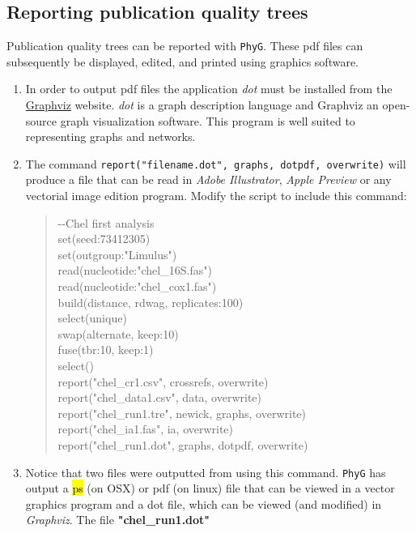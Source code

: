 \documentclass[11pt]{article}
\newcommand{\phyg}{\texttt{PhyG} }
\begin{document}
\subsection{Reporting publication quality trees}
\label{subsec:dotpdf}

Publication quality trees can be reported with \texttt{PhyG}. These pdf files can  
subsequently be displayed, edited, and printed using graphics software.

\begin{enumerate}

\item In order to output pdf files the application \textit{dot} must be installed from 
the \href{https://graphviz.org/download/}{Graphviz} website. \textit{dot} is a graph 
description language and Graphviz an open-source graph visualization software. 
This program is well suited to representing graphs and networks.

\item  The command \texttt{report("filename.dot", graphs, dotpdf, overwrite)} will 
produce a file that can be read in \textit{Adobe Illustrator}, \textit{Apple Preview} 
or any vectorial image edition program. Modify the script to include this command:

	\begin{quote}
	-\/-Chel first analysis\\
	set(seed:73412305)\\
	set(outgroup:"Limulus")\\
	read(nucleotide:"chel\_16S.fas")\\
	read(nucleotide:"chel\_cox1.fas")\\
	build(distance, rdwag, replicates:100)\\
	select(unique)\\
	swap(alternate, keep:10)\\
	fuse(tbr:10, keep:1)\\
	select()\\
	report("chel\_cr1.csv", crossrefs, overwrite)\\
	report("chel\_data1.csv", data, overwrite)\\
	report("chel\_run1.tre", newick, graphs, overwrite)\\
	report("chel\_ia1.fas", ia, overwrite)\\
	report("chel\_run1.dot", graphs, dotpdf, overwrite)\\
	\end{quote}
	
\item Notice that two files were outputted from using this command. \phyg has 
output a \hl{ps} (on OSX) or pdf (on linux) file that can be viewed in a vector graphics program and a dot 
file, which can be viewed (and modified) in \textit{Graphviz}.
The file \textbf{"chel\_run1.dot"} 
\end{enumerate}
\end{document}
